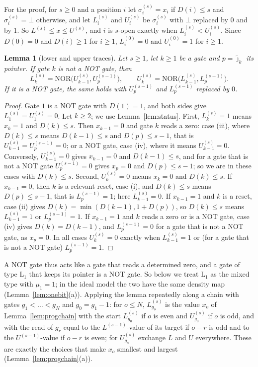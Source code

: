 \documentclass[11pt]{amsart}
\newtheorem{lemma}[theorem]{Lemma}
\theoremstyle{definition}
\theoremstyle{remark}
\newcommand{\jt}{\tilde{\jmath}}
\newcommand{\NOR}{\mathrm{NOR}}
\begin{document}
For the proof, for $s\ge0$ and a position $i$ let $\sigma^{(s)}_i=x_i$ if $D(i)\le s$ and
$\sigma^{(s)}_i=\bot$ otherwise, and let $L^{(s)}_i$ and $U^{(s)}_i$ be $\sigma^{(s)}_i$ with $\bot$
replaced by $0$ and by $1$. So $L^{(s)}\le x\le U^{(s)}$, and $i$ is $s$-open exactly when
$L^{(s)}_i<U^{(s)}_i$. Since $D(0)=0$ and $D(i)\ge1$ for $i\ge1$, $L^{(0)}_i=0$ and $U^{(0)}_i=1$ for
$i\ge1$.

\begin{lemma}[lower and upper traces]\label{lem:lowup}
Let $s\ge1$, let $k\ge1$ be a gate and $p=\jt_k$ its pointer. If gate $k$ is not a NOT gate, then
\[
L^{(s)}_k=\NOR\bigl(U^{(s)}_{k-1},U^{(s-1)}_p\bigr),\qquad U^{(s)}_k=\NOR\bigl(L^{(s)}_{k-1},L^{(s-1)}_p\bigr).
\]
If it is a NOT gate, the same holds with $U^{(s-1)}_p$ and $L^{(s-1)}_p$ replaced by $0$.
\end{lemma}

\begin{proof}
Gate $1$ is a NOT gate with $D(1)=1$, and both sides give $L^{(s)}_1=U^{(s)}_1=0$. Let $k\ge2$; we
use Lemma~\ref{lem:status}. First, $L^{(s)}_k=1$ means $x_k=1$ and $D(k)\le s$. Then $x_{k-1}=0$
and gate $k$ reads a zero: case (iii), where $D(k)\le s$ means $D(k-1)\le s$ and $D(p)\le s-1$,
that is $U^{(s)}_{k-1}=U^{(s-1)}_p=0$; or a NOT gate, case (iv), where it means
$U^{(s)}_{k-1}=0$. Conversely, $U^{(s)}_{k-1}=0$ gives $x_{k-1}=0$ and $D(k-1)\le s$, and for a gate
that is not a NOT gate $U^{(s-1)}_p=0$ gives $x_p=0$ and $D(p)\le s-1$; so we are in these cases
with $D(k)\le s$. Second, $U^{(s)}_k=0$ means $x_k=0$ and $D(k)\le s$. If $x_{k-1}=0$, then $k$ is
a relevant reset, case (i), and $D(k)\le s$ means $D(p)\le s-1$, that is $L^{(s-1)}_p=1$; here
$L^{(s)}_{k-1}=0$. If $x_{k-1}=1$ and $k$ is a reset, case (ii) gives
$D(k)=\min(D(k-1),1+D(p))$, so $D(k)\le s$ means $L^{(s)}_{k-1}=1$ or $L^{(s-1)}_p=1$. If
$x_{k-1}=1$ and $k$ reads a zero or is a NOT gate, case (iv) gives $D(k)=D(k-1)$, and
$L^{(s-1)}_p=0$ for a gate that is not a NOT gate, as $x_p=0$. In all cases
$U^{(s)}_k=0$ exactly when $L^{(s)}_{k-1}=1$ or (for a gate that is not a NOT gate)
$L^{(s-1)}_p=1$.
\end{proof}

\noindent A NOT gate thus acts like a gate that reads a determined zero, and a gate of type
$\mathrm L_1$ that keeps its pointer is a NOT gate. So below we treat $\mathrm L_1$ as the mixed
type with $\mu_1=1$; in the ideal model the two have the same density map
(Lemma~\ref{lem:onebit}(a)). Applying the lemma repeatedly along a chain with gates
$g_1<\dots<g_N$ and $g_0=g_1-1$: for $o\le N$, $L^{(s)}_{g_o}$ is the value $x_o$ of
Lemma~\ref{lem:progchain} with the start $L^{(s)}_{g_0}$ if $o$ is even and $U^{(s)}_{g_0}$ if $o$
is odd, and with the read of $g_r$ equal to the $L^{(s-1)}$-value of its target if $o-r$ is odd and
to the $U^{(s-1)}$-value if $o-r$ is even; for $U^{(s)}_{g_o}$ exchange $L$ and $U$ everywhere.
These are exactly the choices that make $x_o$ smallest and largest
(Lemma~\ref{lem:progchain}(a)).
\end{document}
